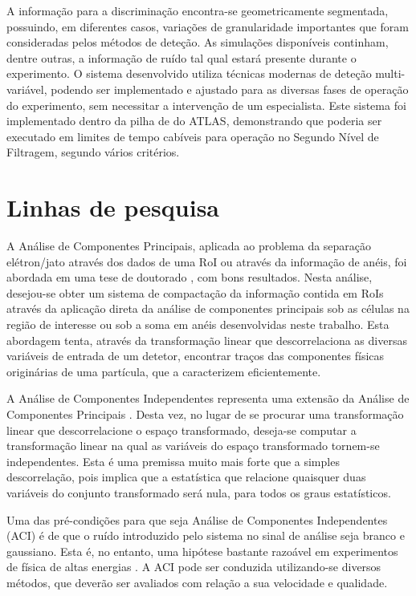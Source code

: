 A informação para a discriminação encontra-se geometricamente segmentada,
possuindo, em diferentes casos, variações de granularidade importantes que
foram consideradas pelos métodos de deteção. As simulações disponíveis
continham, dentre outras, a informação de ruído tal qual estará presente
durante o experimento. O sistema desenvolvido utiliza técnicas modernas de
deteção multi-variável, podendo ser implementado e ajustado para as diversas
fases de operação do experimento, sem necessitar a intervenção de um
especialista. Este sistema foi implementado dentro da pilha de 
do ATLAS, demonstrando que poderia ser executado em limites de tempo cabíveis
para operação no Segundo Nível de Filtragem, segundo vários critérios.

\section{Linhas de pesquisa}

A Análise de Componentes Principais, aplicada ao problema da separação
elétron/jato através dos dados de uma RoI ou através da informação de anéis,
foi abordada em uma tese de doutorado \cite{herman}, com bons
resultados. Nesta análise, desejou-se obter um sistema de compactação da
informação contida em RoIs através da aplicação direta da análise de
componentes principais sob as células na região de interesse ou sob a soma em
anéis desenvolvidas neste trabalho. Esta abordagem tenta, através da
transformação linear que descorrelaciona as diversas variáveis de entrada de
um detetor, encontrar traços das componentes físicas originárias de uma
partícula, que a caracterizem eficientemente.

A Análise de Componentes Independentes representa uma extensão da Análise de
Componentes Principais \cite{oja-ica}. Desta vez, no lugar de se procurar uma
transformação linear que descorrelacione o espaço transformado, deseja-se
computar a transformação linear na qual as variáveis do espaço transformado
tornem-se independentes. Esta é uma premissa muito mais forte que a simples
descorrelação, pois implica que a estatística que relacione quaisquer duas
variáveis do conjunto transformado será nula, para todos os graus
estatísticos.

Uma das pré-condições para que seja Análise de Componentes Independentes (ACI)
é de que o ruído introduzido pelo sistema no sinal de análise seja branco e
gaussiano. Esta é, no entanto, uma hipótese bastante razoável em experimentos
de física de altas energias \cite{knoll, leo}. A ACI pode ser conduzida
utilizando-se diversos métodos, que deverão ser avaliados com relação a sua
velocidade e qualidade.

